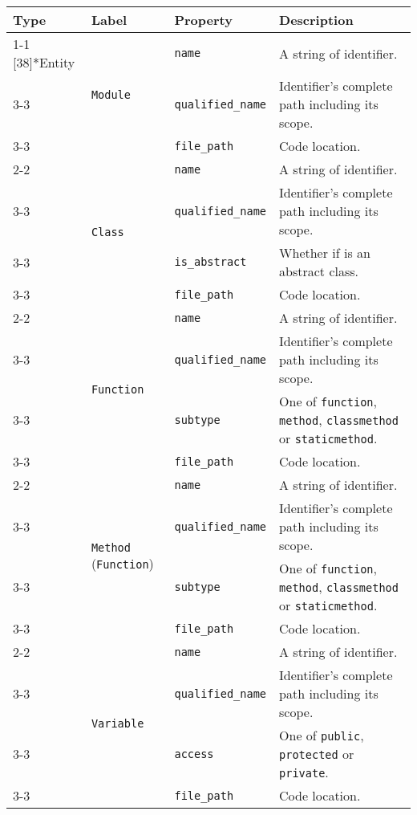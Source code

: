\begin{tabularx}{\textwidth}{p{1.8cm}llX}
\toprule
\textbf{Type} & \textbf{Label} & \textbf{Property} & \textbf{Description} \\
\cmidrule{1-1}\cmidrule{2-2}\cmidrule{3-3}\cmidrule{4-4}
\multirow{19}[38]{*}{Entity} & \multirow{3}[6]{*}{\texttt{Module}} & \texttt{name} & A string of identifier. \\
\cmidrule{3-3}\cmidrule{4-4}
 &  & \texttt{qualified\_\texttt{name}} & Identifier's complete path including its scope. \\
\cmidrule{3-3}\cmidrule{4-4}
 &  & \texttt{file\_path} & Code location. \\
\cmidrule{2-2}\cmidrule{3-3}\cmidrule{4-4}
 & \multirow{4}[8]{*}{\texttt{Class}} & \texttt{name} & A string of identifier. \\
\cmidrule{3-3}\cmidrule{4-4}
 &  & \texttt{qualified\_\texttt{name}} & Identifier's complete path including its scope. \\
\cmidrule{3-3}\cmidrule{4-4}
 &  & \texttt{is\_abstract} & Whether if is an abstract class. \\
\cmidrule{3-3}\cmidrule{4-4}
 &  & \texttt{file\_path} & Code location. \\
\cmidrule{2-2}\cmidrule{3-3}\cmidrule{4-4}
 & \multirow{4}[8]{*}{\texttt{Function}} & \texttt{name} & A string of identifier. \\
\cmidrule{3-3}\cmidrule{4-4}
 &  & \texttt{qualified\_\texttt{name}} & Identifier's complete path including its scope. \\
\cmidrule{3-3}\cmidrule{4-4}
 &  & \texttt{subtype} & One of \texttt{function}, \texttt{method}, \texttt{class\texttt{method}} or \texttt{static\texttt{method}}. \\
\cmidrule{3-3}\cmidrule{4-4}
 &  & \texttt{file\_path} & Code location. \\
\cmidrule{2-2}\cmidrule{3-3}\cmidrule{4-4}
 & \multirow{4}[8]{*}{\texttt{Method} (\texttt{Function})} & \texttt{name} & A string of identifier. \\
\cmidrule{3-3}\cmidrule{4-4}
 &  & \texttt{qualified\_\texttt{name}} & Identifier's complete path including its scope. \\
\cmidrule{3-3}\cmidrule{4-4}
 &  & \texttt{subtype} & One of \texttt{function}, \texttt{method}, \texttt{class\texttt{method}} or \texttt{static\texttt{method}}. \\
\cmidrule{3-3}\cmidrule{4-4}
 &  & \texttt{file\_path} & Code location. \\
\cmidrule{2-2}\cmidrule{3-3}\cmidrule{4-4}
 & \multirow{4}[8]{*}{\texttt{Variable}} & \texttt{name} & A string of identifier. \\
\cmidrule{3-3}\cmidrule{4-4}
 &  & \texttt{qualified\_\texttt{name}} & Identifier's complete path including its scope. \\
\cmidrule{3-3}\cmidrule{4-4}
 &  & \texttt{access} & One of \texttt{public}, \texttt{protected} or \texttt{private}. \\
\cmidrule{3-3}\cmidrule{4-4}
 &  & \texttt{file\_path} & Code location. \\
\bottomrule
\end{tabularx}

